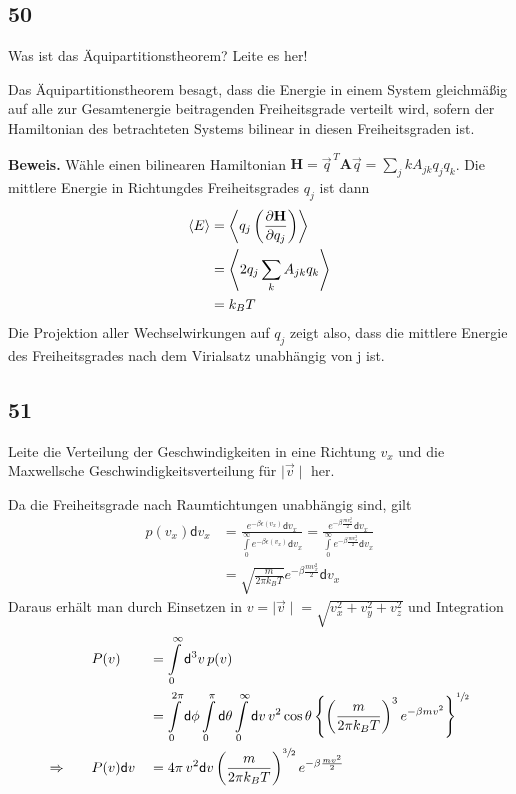 \documentclass[12pt,a4paper]{report}
\newcommand{\betrag}[1]{\ensuremath {\mid #1 \mid}}
\newcommand{\dif}{\mathsf{d}}
\newcommand{\partdd}[2]{\ensuremath {\left(\frac{\partial #1}{\partial #2}}\right)}
\newenvironment{myfrag}{\begin{it}}{\end{it}\vspace{3mm}\par}
\numberwithin{equation}{section}
\begin{document}
\subsection{50}
\begin{myfrag}
Was ist das Äquipartitionstheorem? Leite es her!
\end{myfrag}
Das Äquipartitionstheorem besagt, dass die Energie in einem System gleichmäßig auf alle zur Gesamtenergie beitragenden Freiheitsgrade verteilt wird, sofern der Hamiltonian des betrachteten Systems bilinear in diesen Freiheitsgraden ist.
\par\textbf{Beweis.} Wähle einen bilinearen Hamiltonian $\mathbf{H}=\vec{q}^{\,T}\mathbf{A}\vec{q}=\sum\limits_jk A_{jk}q_jq_k$. Die mittlere Energie \glqq in Richtung\grqq des Freiheitsgrades $q_j$ ist dann 
\begin{align}
	\langle E\rangle&=\left\langle q_j\partdd {\mathbf{H}}{q_j}\right\rangle\\
	&=\left\langle 2q_j\sum\limits_k A_{jk}q_k\right\rangle\\
	&=k_BT\nonumber
\end{align} 
Die Projektion aller Wechselwirkungen auf $q_j$ zeigt also, dass die mittlere Energie des Freiheitsgrades nach dem Virialsatz unabhängig von j ist.
\subsection{51}
\begin{myfrag}
Leite die Verteilung der Geschwindigkeiten in eine Richtung $v_x$ und die
Maxwellsche Geschwindigkeitsverteilung für $\betrag{\vec{v}}$ her.
\end{myfrag}
Da die Freiheitsgrade nach Raumtichtungen unabhängig sind, gilt
\begin{align}
p(v_x)\dif v_x&=\frac{e^{-\beta\epsilon(v_x)}\dif v_x}{\int\limits_0^\infty e^{-\beta\epsilon(v_x)}\dif v_x}=\frac{e^{-\beta\frac{mv_x^2}{2}}\dif v_x}{\int\limits_0^\infty e^{-\beta\frac{mv_x^2}{2}}\dif v_x}\\&=\sqrt{\frac{m}{2\pi k_BT}}e^{-\beta\frac{mv_x^2}{2}}\dif v_x
\end{align}
Daraus erhält man durch Einsetzen in $v=\betrag{\vec{v}}=\sqrt{v_x^2+v_y^2+v_z^2}$ und Integration
\begin{alignat}{2}
&P(v)&&=\int\limits_0^\infty\dif^3v\,p(v)\\
&&&=\int\limits_0^{2\pi}\dif\phi\int\limits_0^\pi\dif\theta\int\limits_0^\infty\dif v\,v^2\cos\theta\left\lbrace\left(\frac{m}{2\pi k_BT}\right)^3e^{-\beta mv^2}\right\rbrace^{\sfrac{1}{2}}\\
\Rightarrow\qquad&P(v)\dif v&&=4\pi\,v^2\dif v\left(\frac{m}{2\pi k_BT}\right)^{\sfrac{3}{2}}e^{-\beta\frac{mv^2}{2}}
\end{alignat}
\end{document}
